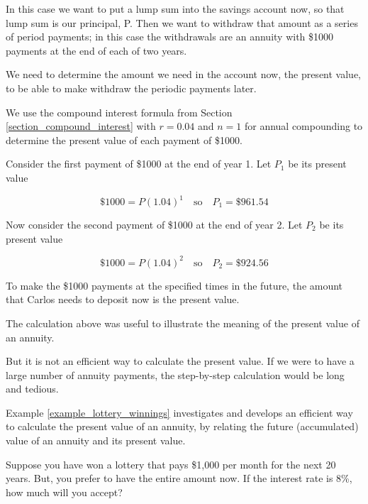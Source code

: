 In this case we want to put a lump sum into the savings account now, so that lump sum is our principal, P.  Then we want to withdraw that amount as a series of period payments; in this case the withdrawals are an annuity with \$1000 payments at the end of each of two years.

We need to determine the amount we need in the account now, the present value, to be able to make withdraw the periodic payments later.

We use the compound interest formula from Section \ref{section_compound_interest} with \( r = 0.04 \) and \( n = 1 \) for annual compounding to determine the present value of each payment of \$1000.

Consider the first payment of \$1000 at the end of year 1. Let \( P_1 \) be its present value

\[ \$1000 = P(1.04)^1 \quad \text{so} \quad P_1=\$961.54 \]

Now consider the second payment of \$1000 at the end of year 2. Let \(P_2\) be its present value

\[ \$1000 = P(1.04)^2 \quad \text{so} \quad P_2=\$924.56 \]

To make the \$1000 payments at the specified times in the future, the amount that Carlos needs to deposit now is the present value.

The calculation above was useful to illustrate the meaning of the present value of an annuity.

But it is not an efficient way to calculate the present value. If we were to have a large number of annuity payments, the step-by-step calculation would be long and tedious.

Example \ref{example_lottery_winnings} investigates and develops an efficient way to calculate the present value of an annuity, by relating the future (accumulated) value of an annuity and its present value.

\begin{example}\label{example_lottery_winnings}
    Suppose you have won a lottery that pays \$1,000 per month for the next 20 years. But, you prefer to have the entire amount now. If the interest rate is 8\%, how much will you accept?
\end{example}

